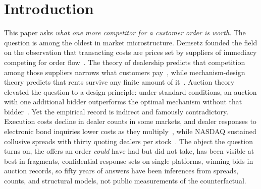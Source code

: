 \documentclass[11pt]{article}
\theoremstyle{plain}
\theoremstyle{definition}
\theoremstyle{remark}
\begin{document}
\section{Introduction}

This paper asks \emph{what one more competitor for a customer order is worth}. The question is among the oldest in market microstructure. Demsetz founded the field on the observation that transacting costs are prices set by suppliers of immediacy competing for order flow~\citep{demsetz1968cost}. The theory of dealership predicts that competition among those suppliers narrows what customers pay~\citep{ho1983dynamics}, while mechanism-design theory predicts that rents survive any finite amount of it~\citep{biais2000competing}. Auction theory elevated the question to a design principle: under standard conditions, an auction with one additional bidder outperforms the optimal mechanism without that bidder~\citep{bulow1996auctions}. Yet the empirical record is indirect and famously contradictory. Execution costs decline in dealer counts in some markets, and dealer responses to electronic bond inquiries lower costs as they multiply~\citep{hendershott2015click}, while NASDAQ sustained collusive spreads with thirty quoting dealers per stock~\citep{christie1994nasdaq}. The object the question turns on, the offers an order \emph{could} have had but did not take, has been visible at best in fragments, confidential response sets on single platforms, winning bids in auction records, so fifty years of answers have been inferences from spreads, counts, and structural models, not public measurements of the counterfactual.
\end{document}
